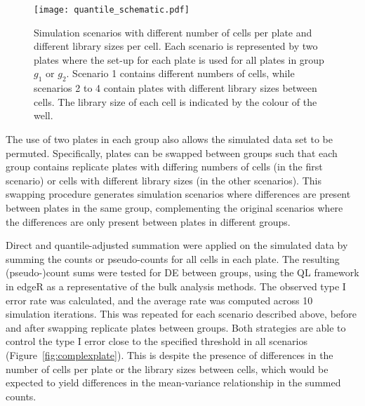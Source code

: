 \documentclass{article}
\begin{document}
\begin{figure}[tb]
    \begin{center}
        \texttt{[image: quantile\_schematic.pdf]}
    \end{center}
    \caption{
        Simulation scenarios with different number of cells per plate and different library sizes per cell.
        Each scenario is represented by two plates where the set-up for each plate is used for all plates in group $g_1$ or $g_2$.
        Scenario 1 contains different numbers of cells, while scenarios 2 to 4 contain plates with different library sizes between cells.
        The library size of each cell is indicated by the colour of the well.
    }
    \label{fig:compsim}
\end{figure}


The use of two plates in each group also allows the simulated data set to be permuted.
Specifically, plates can be swapped between groups such that each group contains replicate plates with differing numbers of cells (in the first scenario)
    or cells with different library sizes (in the other scenarios).
This swapping procedure generates simulation scenarios where differences are present between plates in the same group, 
    complementing the original scenarios where the differences are only present between plates in different groups.

Direct and quantile-adjusted summation were applied on the simulated data by summing the counts or pseudo-counts for all cells in each plate.
The resulting (pseudo-)count sums were tested for DE between groups, using the QL framework in edgeR as a representative of the bulk analysis methods.
The observed type I error rate was calculated, and the average rate was computed across 10 simulation iterations.
This was repeated for each scenario described above, before and after swapping replicate plates between groups.
Both strategies are able to control the type I error close to the specified threshold in all scenarios (Figure~\ref{fig:complexplate}).
This is despite the presence of differences in the number of cells per plate or the library sizes between cells,
    which would be expected to yield differences in the mean-variance relationship in the summed counts.
\end{document}
